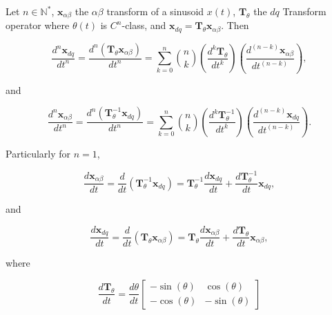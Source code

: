 \begin{lemma}\label{theo:dq_1p_diff}%
	Let $n\in\mathbb{N}^*$, $\mathbf{x}_{\alpha\beta}$ the $\alpha\beta$ transform of a sinusoid $x(t)$, $\mathbf{T}_\theta$ the $dq$ Transform operator where $\theta(t)$ is $C^n$-class, and $\mathbf{x}_{dq} = \mathbf{T}_\theta \mathbf{x}_{\alpha\beta}$. Then

\begin{equation} \dfrac{d^n \mathbf{x}_{dq}}{dt^n} = \dfrac{d^n\left(\mathbf{T}_\theta \mathbf{x}_{\alpha\beta}\right)}{dt^n} = \sum\limits_{k=0}^{n} {n\choose k} \left(\dfrac{d^{k} \mathbf{T}_\theta}{dt^k}\right) \left(\dfrac{d^{\left(n-k\right)} \mathbf{x}_{\alpha\beta}}{dt^{\left(n-k\right)}}\right), \end{equation}

	\noindent and

\begin{equation} \dfrac{d^n\mathbf{x}_{\alpha\beta}}{dt^n} = \dfrac{d^n\left(\mathbf{T}^{-1}_\theta \mathbf{x}_{dq}\right)}{dt^n} = \sum\limits_{k=0}^{n} {n\choose k} \left(\dfrac{d^{k} \mathbf{T}^{-1}_\theta}{dt^k}\right) \left(\dfrac{d^{\left(n-k\right)} \mathbf{x}_{dq}}{dt^{\left(n-k\right)}}\right) .\end{equation}

	Particularly for $n=1$,

\begin{equation} \dfrac{d\mathbf{x}_{\alpha\beta}}{dt} = \dfrac{d}{dt} \left(\mathbf{T}^{-1}_\theta \mathbf{x}_{dq}\right) = \mathbf{T}^{-1}_\theta \dfrac{d\mathbf{x}_{dq}}{dt} + \dfrac{d\mathbf{T}^{-1}_\theta}{dt} \mathbf{x}_{dq}, \end{equation}

	\noindent and

\begin{equation} \dfrac{d\mathbf{x}_{dq}}{dt} = \dfrac{d}{dt} \left(\mathbf{T}_\theta \mathbf{x}_{\alpha\beta}\right) = \mathbf{T}_\theta \dfrac{d\mathbf{x}_{\alpha\beta}}{dt} + \dfrac{d\mathbf{T}_\theta}{dt} \mathbf{x}_{\alpha\beta}, \end{equation}
 
	\noindent where

\begin{equation}
        \dfrac{d\mathbf{T}_\theta }{dt} =
\dfrac{d\theta}{dt}
\left[\begin{array}{cc}
         -\sin\left(\theta\right) &  \cos\left(\theta\right)                    \\[5mm]
         -\cos\left(\theta\right) & -\sin\left(\theta\right)
\end{array}\right]\end{equation}


\end{lemma}
